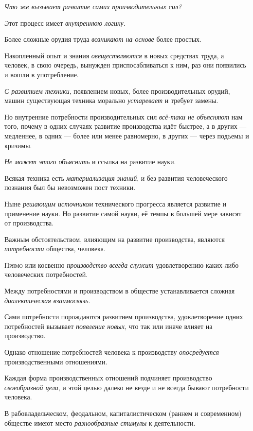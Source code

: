 \documentclass[a4paper,14pt,russian]{extreport}
\begin{document}
\emph{Что же вызывает развитие самих производительных сил?}

Этот процесс имеет \emph{внутреннюю логику}.

Более сложные орудия труда \emph{возникают на основе} более простых.

Накопленный опыт и знания \emph{овеществляются} в новых средствах труда, а человек, в свою очередь, вынужден приспосабливаться к ним, раз они появились и вошли в употребление.

\emph{С развитием техники}, появлением новых, более производительных орудий, машин существующая техника морально \emph{устаревает} и требует замены.

Но внутренние потребности производительных сил \emph{всё-таки не объясняют} нам того, почему в одних случаях развитие производства идёт быстрее, а в других --- медленнее, в одних --- более или менее равномерно, в других --- через подъемы и кризимы.

\emph{Не может этого объяснить} и ссылка на развитие науки.

Всякая техника есть \emph{материализация знаний}, и без развития человеческого познания был бы невозможен пост техники.

Ныне \emph{решающим источником} технического прогресса является развитие и применение науки. Но развитие самой науки, её темпы в большей мере зависят от производства.

Важным обстоятельством, влияющим на развитие производства, являются \emph{потребности} общества, человека.

\textsc{Прямо} или косвенно \emph{производство всегда служит} удовлетворению каких-либо человеческих потребностей.

Между потребностями и производством в обществе устанавливается сложная \emph{диалектическая взаимосвязь}.

Сами потребности порождаются развитием производства, удовлетворение одних потребностей вызывает \emph{появление новых}, что так или иначе влияет на производство.

Однако отношение потребностей человека к производству \emph{опосредуется} производственными отношениями.

Каждая форма производственных отношений подчиняет производство \emph{своеобразной цели}, и этой целью далеко не везде и не всегда бывают потребности человека.

В рабовладельческом, феодальном, капиталистическом (раннем и современном) обществе имеют место \emph{разнообразные стимулы} к деятельности.
\end{document}
